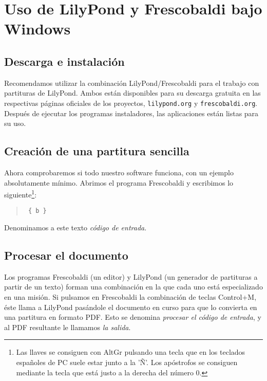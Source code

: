 \section{Uso de LilyPond y Frescobaldi bajo Windows}
\subsection{Descarga e instalación}

Recomendamos utilizar la combinación LilyPond/Frescobaldi para el
trabajo con partituras de LilyPond. Ambos están disponibles para su
descarga gratuita en las respectivas páginas oficiales de los
proyectos, \texttt{lilypond.org} y \texttt{frescobaldi.org}.  Después
de ejecutar los programas instaladores, las aplicaciones están listas
para su uso.



\subsection{Creación de una partitura sencilla}

Ahora comprobaremos si todo nuestro software funciona, con un ejemplo
absolutamente mínimo. Abrimos el programa Frescobaldi y escribimos lo
siguiente\footnote{Las llaves se consiguen con AltGr pulsando una
  tecla que en los teclados españoles de PC suele estar junto a la
  'Ñ'. Los apóstrofos se consiguen mediante la tecla que está justo a
  la derecha del número 0.}:

\begin{quote}
\begin{verbatim}
 { b }
\end{verbatim}
\end{quote}

Denominamos a este texto \emph{código de entrada}.

\subsection{Procesar el documento}

Los programas Frescobaldi (un editor) y LilyPond (un generador de
partituras a partir de un texto) forman una combinación en la que cada
uno está especializado en una misión.  Si pulsamos en Frescobaldi la
combinación de teclas Control+M, éste llama a LilyPond pasándole el
documento en curso para que lo convierta en una partitura en formato
PDF. Esto se denomina \emph{procesar el código de entrada}, y al PDF
resultante le llamamos \emph{la salida}.

